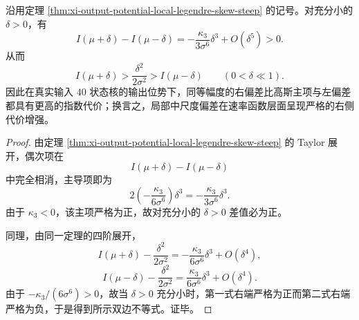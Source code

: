 \begin{corollary}[输出位势局部偏差的严格方向不等式]\label{cor:xi-output-potential-local-legendre-one-sided-asymmetry}
沿用定理 \ref{thm:xi-output-potential-local-legendre-skew-steep} 的记号。对充分小的 \(\delta>0\)，有
\[
\boxed{\;
I(\mu+\delta)-I(\mu-\delta)
=
-\frac{\kappa_3}{3\sigma^6}\delta^3+O(\delta^5)
>0.\;}
\]
从而
\[
\boxed{\;
I(\mu+\delta)>\frac{\delta^2}{2\sigma^2}>I(\mu-\delta)
\qquad(0<\delta\ll1).\;}
\]
因此在真实输入 \(40\) 状态核的输出位势下，同等幅度的右偏差比高斯主项与左偏差都具有更高的指数代价；换言之，局部中尺度偏差在速率函数层面呈现严格的右侧代价增强。
\end{corollary}
\begin{proof}
由定理 \ref{thm:xi-output-potential-local-legendre-skew-steep} 的 Taylor 展开，偶次项在
\[
I(\mu+\delta)-I(\mu-\delta)
\]
中完全相消，主导项即为
\[
2\left(-\frac{\kappa_3}{6\sigma^6}\right)\delta^3
=
-\frac{\kappa_3}{3\sigma^6}\delta^3.
\]
由于 \(\kappa_3<0\)，该主项严格为正，故对充分小的 \(\delta>0\) 差值必为正。
\par
同理，由同一定理的四阶展开，
\[
I(\mu+\delta)-\frac{\delta^2}{2\sigma^2}
=
-\frac{\kappa_3}{6\sigma^6}\delta^3+O(\delta^4),
\]
\[
I(\mu-\delta)-\frac{\delta^2}{2\sigma^2}
=
\frac{\kappa_3}{6\sigma^6}\delta^3+O(\delta^4).
\]
由于
\(
-\kappa_3/(6\sigma^6)>0
\)，故当 \(\delta>0\) 充分小时，第一式右端严格为正而第二式右端严格为负，于是得到所示双边不等式。证毕。
\end{proof}

\endinput





